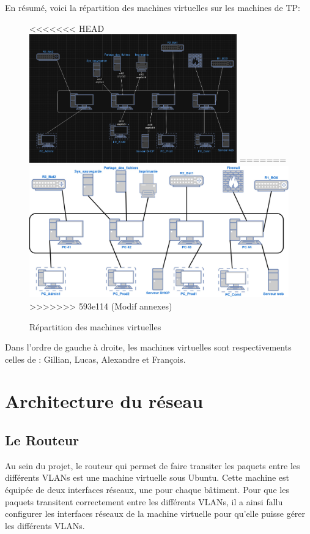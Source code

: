 \documentclass[a4paper,12pt,openany]{report}
\begin{document}
            En résumé, voici la répartition des machines virtuelles sur les machines de TP:
            \begin{figure}
                \centering
<<<<<<< HEAD
                \includegraphics[width=0.8\textwidth]{Images/Repartition_machines_projetReseau.png}
=======
                \includegraphics[width=1.2
                \textwidth]{Images/repartitions_machines.jpg}
>>>>>>> 593e114 (Modif annexes)
                \caption{Répartition des machines virtuelles}
            \end{figure}

            Dans l'ordre de gauche à droite, les machines virtuelles sont respectivements celles de : Gillian, Lucas, Alexandre et François.

    \chapter{Architecture du réseau}
    \section{Le Routeur}
    Au sein du projet, le routeur qui permet de faire transiter les paquets entre les différents VLANs est une machine virtuelle sous Ubuntu. Cette machine est équipée de deux interfaces réseaux, une pour chaque bâtiment. Pour que les paquets transitent correctement entre les différents VLANs, il a ainsi fallu configurer les interfaces réseaux de la machine virtuelle pour qu'elle puisse gérer les différents VLANs.
\end{document}
